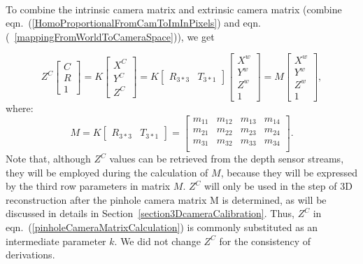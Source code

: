 \\\indent
To combine the intrinsic camera matrix and extrinsic camera matrix (combine eqn.~(\ref{HomoProportionalFromCamToImInPixels}) and eqn.(~\ref{mappingFromWorldToCameraSpace})), we get 

\begin{equation}
Z^C\left[ \begin{array}{c} C \\ R \\ 1 \end{array} \right] %
=K \left[ \begin{array}{c} X^C \\ Y^C \\ Z^C\end{array} \right]%
=K\begin{bmatrix} R_{3*3} & T_{3*1} \end{bmatrix} \left[ \begin{array}{c} X^w \\ Y^w \\ Z^w \\ 1 \end{array} \right]%
=M \left[ \begin{array}{c} X^w \\ Y^w \\ Z^w \\ 1 \end{array} \right]%
 , %
\label{pinholeCameraMatrixCalculation}
\end{equation}%
\noindent
where: %
\begin{equation}
M = K\begin{bmatrix} R_{3*3} & T_{3*1} \end{bmatrix}%
= \begin{bmatrix} 
m_{11} & m_{12} & m_{13} & m_{14} \\
m_{21} & m_{22} & m_{23} & m_{24} \\
m_{31} & m_{32} & m_{33} & m_{34} \\
\end{bmatrix} . %
\label{pinholeMatrix3x4M}
\end{equation}%
%
\noindent
Note that, although \(Z^C\) values can be retrieved from the depth sensor streams, they will be employed during the calculation of \(M\), because they will be expressed by the third row parameters in matrix \(M\). \(Z^C\) will only be used in the step of 3D reconstruction after the pinhole camera matrix M is determined, as will be discussed in details in Section~\ref{section3DcameraCalibration}. Thus, \(Z^C\) in eqn.~(\ref{pinholeCameraMatrixCalculation}) is commonly substituted as an intermediate parameter \(k\). We did not change \(Z^C\) for the consistency of derivations.
